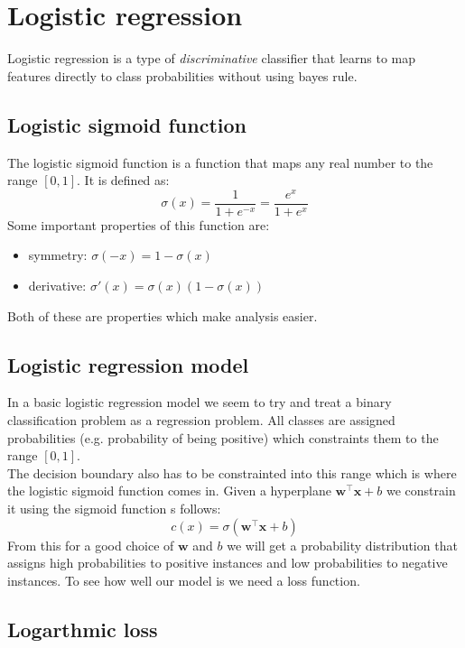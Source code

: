 \documentclass[12pt]{article}
\begin{document}
\section{Logistic regression}

\begin{definition}
    Logistic regression is a type of \textit{discriminative} classifier that learns to map features directly to class probabilities without using bayes rule.
\end{definition}

\subsection{Logistic sigmoid function}

The logistic sigmoid function is a function that maps any real number to the range $[0, 1]$. It is defined as:
\[
    \sigma(x) = \frac{1}{1+e^{-x}} = \frac{e^x}{1+e^x}
\]
Some important properties of this function are: 
\begin{itemize}[leftmargin=*, noitemsep]
    \item symmetry: $\sigma(-x) = 1 - \sigma(x)$
    \item derivative: $\sigma'(x) = \sigma(x)(1-\sigma(x))$
\end{itemize}

Both of these are properties which make analysis easier.

\subsection{Logistic regression model}

In a basic logistic regression model we seem to try and treat a binary classification problem as a regression problem. All classes are assigned probabilities (e.g. probability of being positive) which constraints them to the range $[0, 1]$. \\
The decision boundary also has to be constrainted into this range which is where the logistic sigmoid function comes in. Given a hyperplane $\mathbf w ^\intercal \mathbf x + b$ we constrain it using the sigmoid function  s follows: 
\[
    c(x) = \sigma(\mathbf w ^\intercal \mathbf x + b)  
\]
From this for a good choice of $\mathbf w$ and $b$ we will get a probability distribution that assigns high probabilities to positive instances and low probabilities to negative instances. To see how well our model is we need a loss function.

\subsection{Logarthmic loss}
\end{document}
